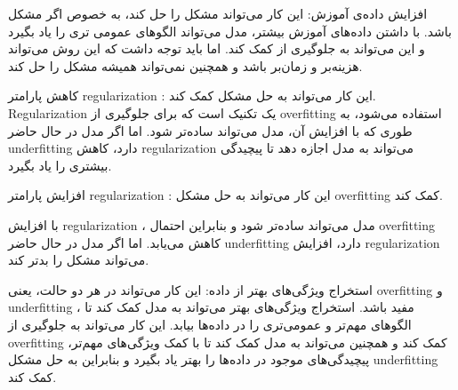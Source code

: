 

افزایش داده‌ی آموزش: این کار می‌تواند مشکل را حل کند، به خصوص اگر مشکل
 باشد. با داشتن داده‌های آموزش بیشتر، مدل می‌تواند الگوهای عمومی تری را یاد بگیرد و این می‌تواند به جلوگیری از
کمک کند. اما باید توجه داشت که این روش می‌تواند هزینه‌بر و زمان‌بر باشد و همچنین نمی‌تواند همیشه مشکل
را حل کند.

کاهش پارامتر regularization : این کار می‌تواند به حل مشکل
کمک کند. Regularization یک تکنیک است که برای جلوگیری از overfitting استفاده می‌شود، به طوری که با افزایش آن، مدل می‌تواند ساده‌تر شود. اما اگر مدل در حال حاضر underfitting دارد، کاهش regularization می‌تواند به مدل اجازه دهد تا پیچیدگی بیشتری را یاد بگیرد.

افزایش پارامتر regularization : این کار می‌تواند به حل مشکل overfitting کمک کند. 

با افزایش regularization ، مدل می‌تواند ساده‌تر شود و بنابراین احتمال overfitting کاهش می‌یابد. اما اگر مدل در حال حاضر underfitting دارد، افزایش regularization می‌تواند مشکل را بدتر کند.

استخراج ویژگی‌های بهتر از داده: این کار می‌تواند در هر دو حالت، یعنی overfitting و underfitting ، مفید باشد. استخراج ویژگی‌های بهتر می‌تواند به مدل کمک کند تا الگوهای مهم‌تر و عمومی‌تری را در داده‌ها بیابد. این کار می‌تواند به جلوگیری از overfitting کمک کند و همچنین می‌تواند به مدل کمک کند تا با کمک ویژگی‌های مهم‌تر، پیچیدگی‌های موجود در داده‌ها را بهتر یاد بگیرد و بنابراین به حل مشکل underfitting کمک کند.